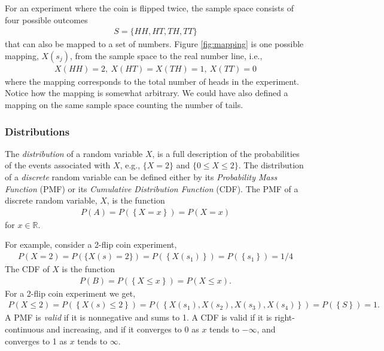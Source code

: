 For an experiment where the coin is flipped twice, 
the sample space consists of four possible outcomes
\begin{align}
S = \{HH, HT,TH, TT\}
\end{align}
that can also be mapped to a set of numbers. 
Figure \ref{fig:mapping} is one possible mapping, \(X(s_{j})\), 
from the sample space to the real number line, i.e.,
\begin{align}
X(HH) = 2,\ X(HT) = X(TH) = 1,\ X(TT) = 0
\end{align}
where the mapping corresponds 
to the total number of heads in the experiment. 
Notice how the mapping is somewhat arbitrary. 
We could have also defined a mapping on 
the same sample space counting the number of tails.

\subsubsection{Distributions}

The \emph{distribution} of a random variable \(X\), 
is a full description of the probabilities of the events associated with \(X\),
e.g., \(\{ X = 2\}\) and \(\{ 0 \leq X \leq 2\}\). 
The distribution of a \emph{discrete} random variable can be defined either 
by its \emph{Probability Mass Function} (PMF) or 
its \emph{Cumulative Distribution Function} (CDF). 
The PMF of a discrete random variable, \(X\), is the function
\begin{align}
P(A) = P\left( \left\{ X = x \right\} \right) = P(X = x)
\end{align}
for \(x \in \mathbb{R}\). 

For example, 
consider a 2-flip coin experiment,
\begin{align}
P(X = 2) = 
P\left( \{ X(s) = 2\} \right) = 
P\left( \left\{ X(s_{1}) \right\} \right) = 
P(\left\{ s_{1} \right\}) = 1/4
\end{align}
The CDF of \(X\) is the function
\begin{align}
P(B) = 
P\left( \left\{ X \leq x \right\} \right) = 
P(X \leq x).
\end{align}
For a 2-flip coin experiment we get,
\begin{align}
P(X \leq 2) = 
P\left( \left\{ X(s) \leq 2 \right\} \right) = 
P\left( \left\{ X\left( s_{1} \right), X\left( s_{2} \right), X\left( s_{3} \right), X\left( s_{4} \right) \right\} \right) = 
P\left( \left\{ S \right\} \right) = 1.
\end{align}
A PMF is \emph{valid} if it is nonnegative and sums to 1. 
A CDF is valid if it is right-continuous and increasing, 
and if it converges to 0 as \(x\) tends to \(- \infty\), 
and converges to 1 as \(x\) tends to \(\infty\).

